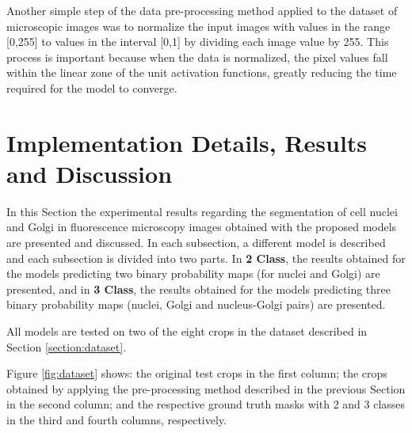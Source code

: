 Another simple step of the data pre-processing method applied to the dataset of microscopic images was to normalize the input images with values in the range [0,255] to values in the interval [0,1] by dividing each image value by 255. This process is important because when the data is normalized, the pixel values fall within the linear zone of the unit activation functions, greatly reducing the time required for the model to converge.

\section{Implementation Details, Results and Discussion}

In this Section the experimental results regarding the segmentation of cell nuclei and Golgi in fluorescence microscopy images obtained with the proposed models are presented and discussed. In each subsection, a different model is described and each subsection is divided into two parts. In \textbf{2 Class}, the results obtained for the models predicting two binary probability maps (for nuclei and Golgi) are presented, and in \textbf{3 Class}, the results obtained for the models predicting three binary probability maps (nuclei, Golgi and nucleus-Golgi pairs) are presented.

All models are tested on two of the eight crops in the dataset described in Section \ref{section:dataset}. 

​Figure \ref{fig:dataset} shows: the original test crops in the first column; the crops obtained by applying the pre-processing method described in the previous Section in the second column; and the respective ground truth masks with 2 and 3 classes in the third and fourth columns, respectively.


